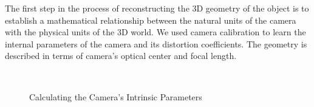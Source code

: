 The first step in the process of reconstructing the 3D geometry of the object
is to establish a mathematical relationship between the natural units of the
camera with the physical units of the 3D world. We used camera calibration to
learn the internal parameters of the camera and its distortion coefficients.
The geometry is described in terms of camera's optical center and focal
length.

\begin{figure}[ht!]
\centering
{}\quad
{} \\
\quad
{}
\caption{Calculating the Camera's Intrinsic Parameters}
\label{figure:camera-calibration-intrinsics}
\end{figure}

